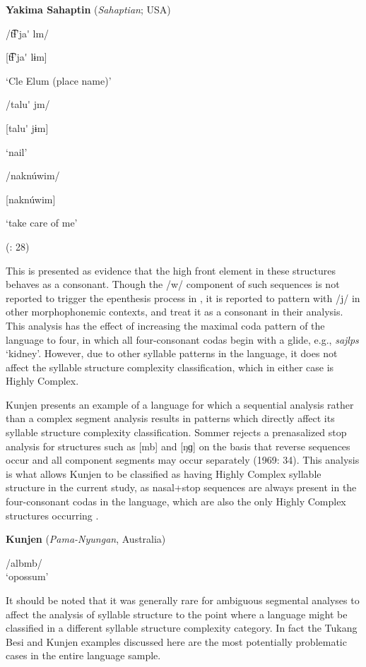 \ea\label{ex:4.7}
  \textbf{Yakima Sahaptin} (\textit{Sahaptian}; USA)

\ea  /t͡ɬ’ja\'{} lm/

  [t͡ɬ’ja\'{} lɨm]

  ‘Cle Elum (place name)’

\ex  /talu\'{} jm/

  [talu\'{} jɨm]

  ‘nail’

\ex  /naknúwim/

  [naknúwim]

  ‘take care of me’

(\citealt{HargusBeavert2006}: 28)
\z
\z

This is presented as evidence that the high front element in these structures behaves as a consonant. Though the /w/ component of such sequences is not reported to trigger the epenthesis process in , it is reported to pattern with /j/ in other morphophonemic contexts, and \citet{HargusBeavert2006} treat it as a consonant in their analysis. This analysis has the effect of increasing the maximal coda pattern of the language to four, in which all four-consonant codas begin with a glide, e.g., \textit{sajlps} ‘kidney’. However, due to other syllable patterns in the language, it does not affect the syllable structure complexity classification, which in either case is Highly Complex.

  Kunjen presents an example of a language for which a sequential analysis rather than a complex segment analysis results in patterns which directly affect its syllable structure complexity classification. Sommer rejects a prenasalized stop analysis for structures such as [mb] and [ŋɡ] on the basis that reverse sequences occur and all component segments may occur separately (1969: 34). This analysis is what allows Kunjen to be classified as having Highly Complex syllable structure in the current study, as nasal+stop sequences are always present in the four-consonant codas in the language, which are also the only Highly Complex structures occurring .

\ea\label{ex:4.8}
   \textbf{Kunjen} (\textit{Pama-Nyungan}, Australia)

/albmb/\\
\glt ‘opossum’
\citep[33]{Sommer1969}
\z

  It should be noted that it was generally rare for ambiguous segmental analyses to affect the analysis of syllable structure to the point where a language might be classified in a different syllable structure complexity category. In fact the Tukang Besi and Kunjen examples discussed here are the most potentially problematic cases in the entire language sample.

